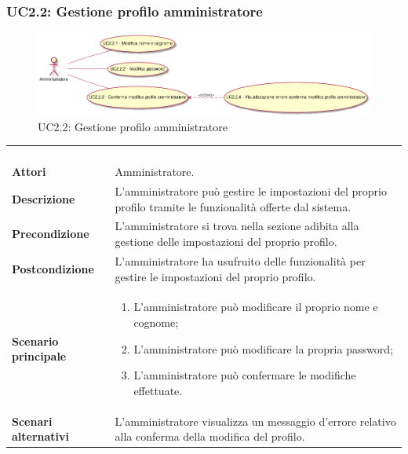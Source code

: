 \subsubsection{UC2.2: Gestione profilo amministratore}
\label{UC2.2}
\begin{figure}[h]
\centering
\includegraphics[width=\textwidth,height=\textheight,keepaspectratio]{images/UseCaseUC22.png}
\caption{UC2.2: Gestione profilo amministratore}
\end{figure}
\begin{longtable}{l|p{10cm}}
\rowcolor[gray]{0.8} \multicolumn{2}{c}{} \\
\rowcolor[gray]{0.8} \multicolumn{2}{c}{\textbf{UC2.2 - Gestione profilo amministratore}} \\
\rowcolor[gray]{0.8} \multicolumn{2}{c}{} \\
\hline
&\\
\textbf{Attori} & Amministratore.\\[7pt]
\textbf{Descrizione} & L'amministratore può gestire le impostazioni del proprio profilo tramite le funzionalità  offerte dal sistema.\\[7pt]
\textbf{Precondizione} & L'amministratore si trova nella sezione adibita alla gestione delle impostazioni del proprio profilo.\\[7pt]
\textbf{Postcondizione} & L'amministratore ha usufruito delle funzionalità per gestire le impostazioni del proprio profilo.\\[7pt]
\textbf{Scenario principale} &\begin{enumerate}
\item  L'amministratore può modificare il proprio nome e cognome;
\item  L'amministratore può modificare la propria password;
\item  L'amministratore può confermare le modifiche effettuate.
\end{enumerate}
\\[7pt]
\textbf{Scenari alternativi} & L'amministratore visualizza un messaggio d'errore relativo alla conferma della modifica del profilo.\\[7pt]\hline
\end{longtable}


